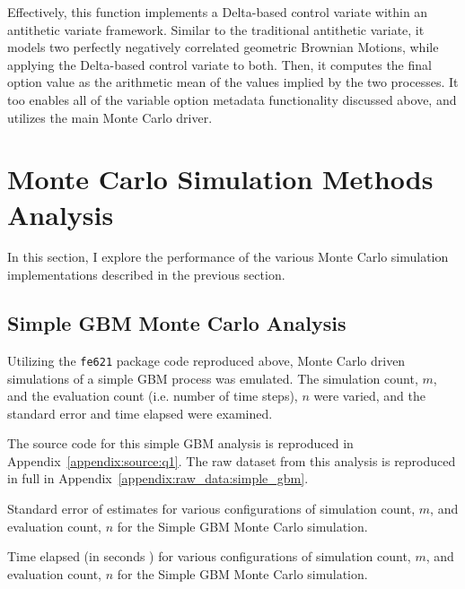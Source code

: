 \documentclass[10pt]{article}
\begin{document}
Effectively, this function implements a Delta-based control variate within an antithetic variate framework. Similar to the traditional antithetic variate, it models two perfectly negatively correlated geometric Brownian Motions, while applying the Delta-based control variate to both. Then, it computes the final option value as the arithmetic mean of the values implied by the two processes. It too enables all of the variable option metadata functionality discussed above, and utilizes the main Monte Carlo driver.

    


\newpage


\section{Monte Carlo Simulation Methods Analysis}

In this section, I explore the performance of the various Monte Carlo simulation implementations described in the previous section.

\subsection{Simple GBM Monte Carlo Analysis}

Utilizing the \texttt{fe621} package code reproduced above, Monte Carlo driven simulations of a simple GBM process was emulated. The simulation count, $m$, and the evaluation count (i.e. number of time steps), $n$ were varied, and the standard error and time elapsed were examined.

The source code for this simple GBM analysis is reproduced in Appendix~\ref{appendix:source:q1}. The raw dataset from this analysis is reproduced in full in Appendix~\ref{appendix:raw_data:simple_gbm}.

\begin{table}[!h]
    \centering
    \caption{Standard error of estimates for various configurations of simulation count, $m$, and evaluation count, $n$ for the Simple GBM Monte Carlo simulation.}
    \label{table:simple_mc_std_err}
\end{table}

\begin{table}[!h]
    \centering
    \caption{Time elapsed (in seconds
    ) for various configurations of simulation count, $m$, and evaluation count, $n$ for the Simple GBM Monte Carlo simulation.}
    \label{table:simple_mc_eval_time}
\end{table}
\end{document}
